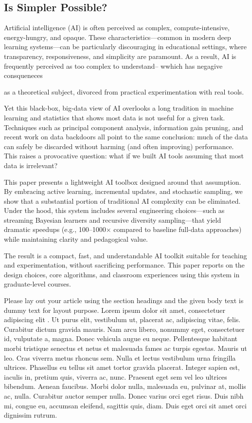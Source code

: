 \documentclass[AMA,STIX2COL]{WileyNJDv5}
\begin{document}
\subsection{Is Simpler Possible?}

Artificial intelligence (AI) is often perceived as complex, compute-intensive, energy-hungry, and opaque. These characteristics—common in modern deep learning systems—can be particularly discouraging in educational settings, where transparency, responsiveness, and simplicity are paramount. As a result, AI is frequently perceived as too complex to understand-- wwhich has negagive consqueneces

as a theoretical subject, divorced from practical experimentation with real tools.

Yet this black-box, big-data view of AI overlooks a long tradition in machine learning and statistics that shows most data is not useful for a given task. Techniques such as principal component analysis, information gain pruning, and recent work on data backdoors all point to the same conclusion: much of the data can safely be discarded without harming (and often improving) performance. This raises a provocative question: what if we built AI tools assuming that most data is irrelevant?

This paper presents a lightweight AI toolbox designed around that assumption. By embracing active learning, incremental updates, and stochastic sampling, we show that a substantial portion of traditional AI complexity can be eliminated. Under the hood, this system includes several engineering choices—such as streaming Bayesian learners and recursive diversity sampling—that yield dramatic speedups (e.g., 100–1000× compared to baseline full-data approaches) while maintaining clarity and pedagogical value.

The result is a compact, fast, and understandable AI toolkit suitable for teaching and experimentation, without sacrificing performance. This paper reports on the design choices, core algorithms, and classroom experiences using this system in graduate-level courses.



Please lay out your article using the section headings and the given body text is dummy text for layout purpose.
Lorem ipsum dolor sit amet, consectetuer adipiscing elit \cite{Hirt1974}. Ut purus elit, vestibulum ut, placerat ac, adipiscing vitae,
felis. Curabitur dictum gravida mauris. Nam arcu libero, nonummy eget, consectetuer id, vulputate a, magna. Donec
vehicula augue eu neque. Pellentesque habitant morbi tristique senectus et netus et malesuada fames ac turpis egestas.
Mauris ut leo. Cras viverra metus rhoncus sem. Nulla et lectus vestibulum urna fringilla ultrices. Phasellus eu tellus
sit amet tortor gravida placerat. Integer sapien est, iaculis in, pretium quis, viverra ac, nunc. Praesent eget sem vel
leo ultrices bibendum. Aenean faucibus. Morbi dolor nulla, malesuada eu, pulvinar at, mollis ac, nulla. Curabitur
auctor semper nulla. Donec varius orci eget risus. Duis nibh mi, congue eu, accumsan eleifend, sagittis quis, diam.
Duis eget orci sit amet orci dignissim rutrum.
\end{document}
